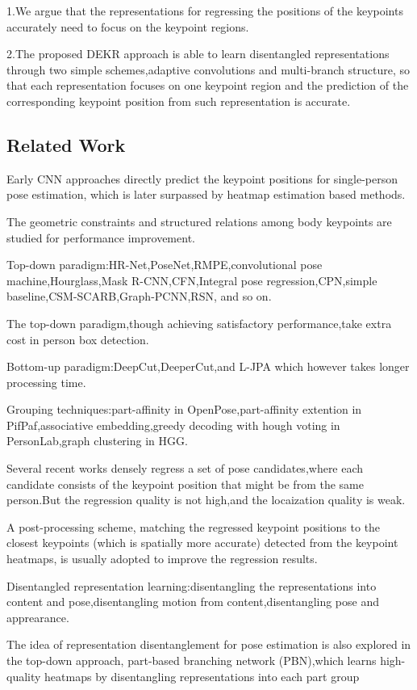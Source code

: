 \documentclass[11pt]{article}
\begin{document}
1.We argue that the representations for regressing the positions of the keypoints accurately need to focus on the keypoint regions.

2.The proposed DEKR approach is able to learn disentangled representations through two simple schemes,adaptive convolutions and multi-branch structure, so that each representation focuses on one keypoint region and the prediction of the corresponding keypoint position from such representation is accurate.
\subsection{Related Work}
Early CNN approaches directly predict the keypoint positions for single-person pose estimation, which is later surpassed by heatmap estimation based methods.

The geometric constraints and structured relations among body keypoints are studied for performance improvement.

Top-down paradigm:HR-Net,PoseNet,RMPE,convolutional pose machine,Hourglass,Mask R-CNN,CFN,Integral pose regression,CPN,simple baseline,CSM-SCARB,Graph-PCNN,RSN, and so on.

The top-down paradigm,though achieving satisfactory performance,take extra cost in person box detection.

Bottom-up paradigm:DeepCut,DeeperCut,and L-JPA which however takes longer processing time.

Grouping techniques:part-affinity in OpenPose,part-affinity extention in PifPaf,associative embedding,greedy decoding with hough voting in PersonLab,graph clustering in HGG.

Several recent works densely regress a set of pose candidates,where each candidate consists of the keypoint position that might be from the same person.But the regression quality is not high,and the locaization quality is weak.

A post-processing scheme, matching the regressed keypoint positions to the closest keypoints
(which is spatially more accurate) detected from the keypoint heatmaps, is usually adopted to improve the regression results.

Disentangled representation learning:disentangling the representations into content and pose,disentangling motion from content,disentangling pose and apprearance.

The idea of representation disentanglement for pose estimation is also explored in the top-down approach, part-based branching network (PBN),which learns high-quality heatmaps by disentangling representations into each part group
\end{document}
